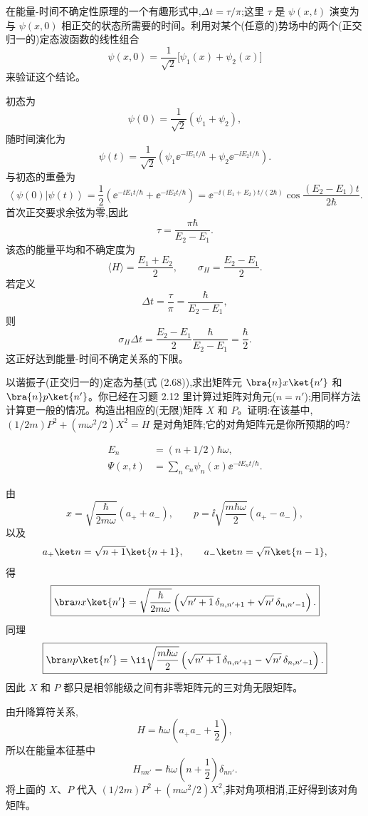 \begin{question}
在能量-时间不确定性原理的一个有趣形式中,$\Delta t=\tau/\pi$;这里 $\tau$ 是 $\psi(x,t)$ 演变为与 $\psi(x,0)$ 相正交的状态所需要的时间。利用对某个(任意的)势场中的两个(正交归一的)定态波函数的线性组合
\[
\psi(x,0)=\frac{1}{\sqrt2}\bigl[\psi_1(x)+\psi_2(x)\bigr]
\]
来验证这个结论。
\begin{solution}
初态为
\[
\psi(0)=\frac1{\sqrt2}(\psi_1+\psi_2),
\]
随时间演化为
\[
\psi(t)=\frac1{\sqrt2}\left(\psi_1\ee^{-\ii E_1t/\hbar}
+\psi_2\ee^{-\ii E_2t/\hbar}\right).
\]
与初态的重叠为
\[
\left\langle \psi(0)|\psi(t) \right\rangle
=\frac12\left(\ee^{-\ii E_1t/\hbar}+\ee^{-\ii E_2t/\hbar}\right)
=\ee^{-\ii(E_1+E_2)t/(2\hbar)}
\cos\frac{(E_2-E_1)t}{2\hbar}.
\]
首次正交要求余弦为零,因此
\[
\tau=\frac{\pi\hbar}{E_2-E_1}.
\]
该态的能量平均和不确定度为
\[
\langle H\rangle=\frac{E_1+E_2}{2},
\qquad
\sigma_H=\frac{E_2-E_1}{2}.
\]
若定义
\[
\Delta t=\frac\tau\pi=\frac{\hbar}{E_2-E_1},
\]
则
\[
\sigma_H\Delta t=\frac{E_2-E_1}{2}\frac{\hbar}{E_2-E_1}=\frac\hbar2.
\]
这正好达到能量-时间不确定关系的下限。
\end{solution}
\end{question}

\begin{question}
以谐振子(正交归一的)定态为基(式 (2.68)),求出矩阵元 $\bra{n}x\ket{n'}$ 和 $\bra{n}p\ket{n'}$。你已经在习题 2.12 里计算过矩阵对角元($n=n'$);用同样方法计算更一般的情况。构造出相应的(无限)矩阵 $X$ 和 $P$。证明:在该基中,$(1/2m)P^2+(m\omega^2/2)X^2=H$ 是对角矩阵;它的对角矩阵元是你所预期的吗?

\par\smallskip
{}\[\begin{aligned}E_n&=(n+1/2)\hbar\omega,\\\Psi(x,t)&=\sum_n c_n\psi_n(x)\ee^{-\ii E_nt/\hbar}.\end{aligned}\]

\begin{solution}
由
\[
x=\sqrt{\frac{\hbar}{2m\omega}}(a_++a_-),
\qquad
p=\ii\sqrt{\frac{m\hbar\omega}{2}}(a_+-a_-),
\]
以及
\[
a_+\ket n=\sqrt{n+1}\ket{n+1},
\qquad
a_-\ket n=\sqrt n\ket{n-1},
\]
得
\[
\boxed{\bra n x\ket{n'}=\sqrt{\frac{\hbar}{2m\omega}}
\left(\sqrt{n'+1}\,\delta_{n,n'+1}+\sqrt{n'}\,\delta_{n,n'-1}\right).}
\]
同理
\[
\boxed{\bra n p\ket{n'}=\ii\sqrt{\frac{m\hbar\omega}{2}}
\left(\sqrt{n'+1}\,\delta_{n,n'+1}-\sqrt{n'}\,\delta_{n,n'-1}\right).}
\]
因此 $X$ 和 $P$ 都只是相邻能级之间有非零矩阵元的三对角无限矩阵。

由升降算符关系,
\[
H=\hbar\omega\left(a_+a_-+\frac12\right),
\]
所以在能量本征基中
\[
\boxed{H_{nn'}=\hbar\omega\left(n+\frac12\right)\delta_{nn'}.}
\]
将上面的 $X$、$P$ 代入 $(1/2m)P^2+(m\omega^2/2)X^2$,非对角项相消,正好得到该对角矩阵。
\end{solution}
\end{question}

